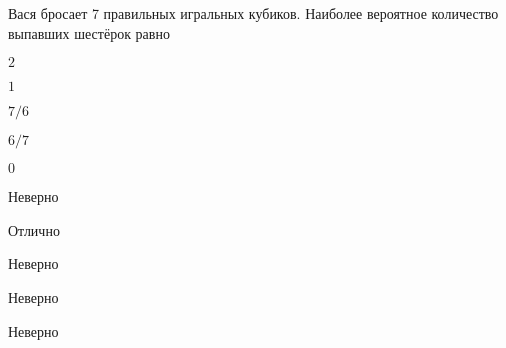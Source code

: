 
\begin{question}
Вася бросает 7 правильных игральных кубиков. Наиболее вероятное
количество выпавших шестёрок равно
\begin{answerlist}
  \item \(2\)
  \item \(1\)
  \item \(7/6\)
  \item \(6/7\)
  \item \(0\)
\end{answerlist}
\end{question}

\begin{solution}
\begin{answerlist}
  \item Неверно
  \item Отлично
  \item Неверно
  \item Неверно
  \item Неверно
\end{answerlist}
\end{solution}

